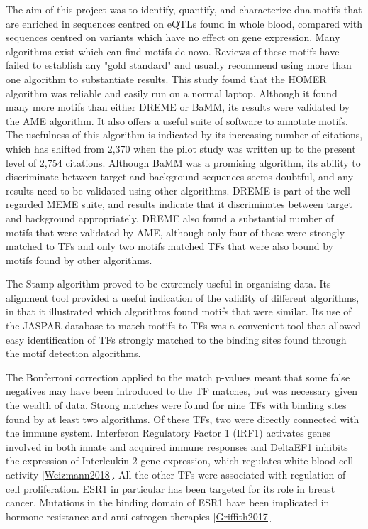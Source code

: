 \documentclass[12pt]{article}
\begin{document}
The aim of this project was to identify, quantify, and characterize dna motifs that are enriched in sequences centred on eQTLs found in whole blood, compared with sequences centred on variants which have no effect on gene expression.
Many algorithms exist which can find motifs de novo. Reviews of these motifs have failed to establish any "gold standard" and usually recommend using more than one algorithm to substantiate results. This study found that the HOMER algorithm was reliable and easily run on a normal laptop. Although it found many more motifs than either DREME or BaMM, its results were validated by the AME algorithm. It also offers a useful suite of software to annotate motifs. The usefulness of this algorithm is indicated by its increasing number of citations, which has shifted from 2,370 when the pilot study was written up to the present level of 2,754 citations. Although BaMM was a promising algorithm, its ability to discriminate between target and background sequences seems doubtful, and any results need to be validated using other algorithms. DREME is part of the well regarded MEME suite, and results indicate that it discriminates between target and background appropriately. DREME also found a substantial number of motifs that were validated by AME, although only four of these were strongly matched to TFs and only two motifs matched TFs that were also bound by motifs found by other algorithms.

The Stamp algorithm proved to be extremely useful in organising data. Its alignment tool provided a useful indication of the validity of different algorithms, in that it illustrated which algorithms found motifs that were similar. Its use of the JASPAR database to match motifs to TFs was a convenient tool that allowed easy identification of TFs strongly matched to the binding sites found through the motif detection algorithms.

The Bonferroni correction applied to the match p-values meant that some false negatives may have been introduced to the TF matches, but was necessary given the wealth of data. Strong matches were found for nine TFs with binding sites found by at least two algorithms. Of these TFs, two were directly connected with the immune system. Interferon Regulatory Factor 1 (IRF1) activates genes involved in both innate and acquired immune responses and DeltaEF1 inhibits the expression of Interleukin-2 gene expression, which regulates white blood cell activity \ref{Weizmann2018}. All the other TFs were associated with regulation of cell proliferation. ESR1 in particular has been targeted for its role in breast cancer. Mutations in the binding domain of ESR1 have been implicated in hormone resistance and anti-estrogen therapies \ref{Griffith2017}
\end{document}
